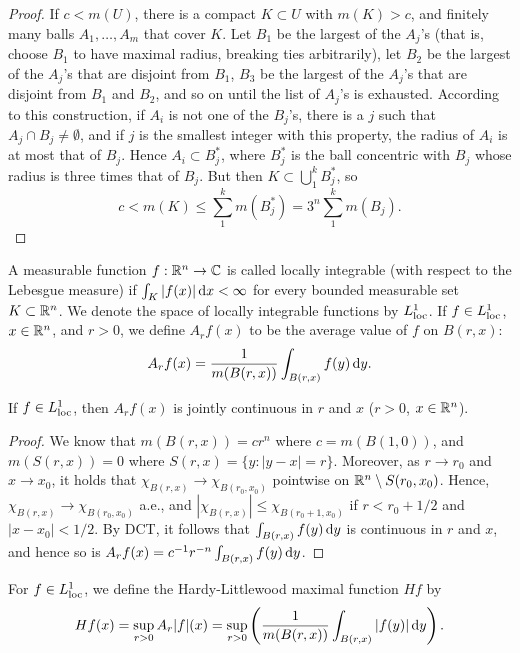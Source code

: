 \documentclass[12pt]{article} %
\begin{document}
\begin{proof}
    If $c < m(U)$, there is a compact $K \subset U$ with $m(K) > c$, and finitely many balls $A_1, \ldots, A_m$ that cover $K$. Let $B_1$ be the largest of the $A_j$'s (that is, choose $B_1$ to have maximal radius, breaking ties arbitrarily), let $B_2$ be the largest of the $A_j$'s that are disjoint from $B_1$, $B_3$ be the largest of the $A_j$'s that are disjoint from $B_1$ and $B_2$, and so on until the list of $A_j$'s is exhausted. According to this construction, if $A_i$ is not one of the $B_j$'s, there is a $j$ such that $A_j
    \cap B_j \neq \emptyset$, and if $j$ is the smallest integer with this property, the radius of $A_i$ is at most that of $B_j$. Hence $A_i \subset B_j^*$, where $B_j^*$ is the ball concentric with $B_j$ whose radius is three times that of $B_j$. But then $K \subset \bigcup_1^k B_j^*$, so \[c < m(K) \leq \sum_1^k m(B_j^*) = 3^n \sum_1^k m(B_j).\]
\end{proof}

\begin{definition}
    A measurable function $f : \mathbb{R}^n \to \mathbb{C}$ is called locally integrable (with respect to the Lebesgue measure) if $\int_K |f(x)|\, \mathrm{d} x < \infty$ for every bounded measurable set $K \subset \mathbb{R}^n$. We denote the space of locally integrable functions by $L_{\operatorname{loc}}^1$. If $f \in L_{\operatorname{loc}}^1$, $x \in \mathbb{R}^n$, and $r > 0$, we define $A_r f(x)$ to be the average value of $f$ on $B(r, x)$: \[A_r f(x) = \frac{1}{m(B(r, x))} \int_{B(r, x)} f(y) \, \mathrm{d} y.\]
\end{definition}

\begin{lemma}
    If $f \in L_{\operatorname{loc}}^1$, then $A_r f(x)$ is jointly continuous in $r$ and $x$ ($r > 0$, $x \in \mathbb{R}^n$).
\end{lemma}

\begin{proof}
    We know that $m(B(r, x)) = cr^n$ where $c = m(B(1, 0))$, and $m(S(r, x)) = 0$ where $S(r, x) = \{y : |y-x| = r\}$. Moreover, as $r \to r_0$ and $x \to x_0$, it holds that $\chi_{B(r, x)} \to \chi_{B(r_0, x_0)}$ pointwise on $\mathbb{R}^n \setminus S(r_0, x_0)$. Hence, $\chi_{B(r, x)} \to \chi_{B(r_0, x_0)}$ a.e., and $|\chi_{B(r, x)}| \leq \chi_{B(r_0 + 1, x_0)}$ if $r < r_0 + 1/2$ and $|x-x_0| < 1/2$. By DCT, it follows that $\int_{B(r, x)}f(y)\, \mathrm{d} y$ is continuous in $r$ and $x$, and hence so is $A_r f(x) = c^{-1}r^{-n} \int_{B(r, x)} f(y) \, \mathrm{d} y$.
\end{proof}

\begin{definition}
    For $f \in L_{\operatorname{loc}}^1$, we define the Hardy-Littlewood maximal function $Hf$ by \[Hf(x) = \sup_{r > 0} A_r |f|(x) = \sup_{r > 0} \left( \frac{1}{m(B(r, x))} \int_{B(r, x)} |f(y)|\, \mathrm{d} y \right).\]
\end{definition}
\end{document}

